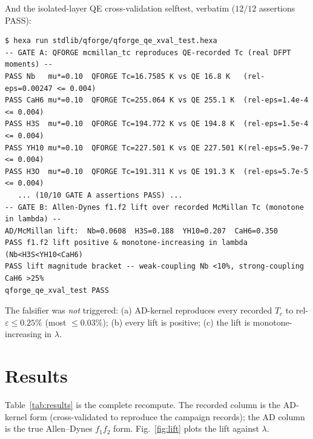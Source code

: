 \documentclass[11pt,a4paper]{article}
\begin{document}
\noindent And the isolated-layer QE cross-validation selftest, verbatim
($12/12$ assertions PASS):

\begin{lstlisting}[basicstyle=\ttfamily\footnotesize,frame=single,xleftmargin=0pt]
$ hexa run stdlib/qforge/qforge_qe_xval_test.hexa
-- GATE A: QFORGE mcmillan_tc reproduces QE-recorded Tc (real DFPT moments) --
PASS Nb   mu*=0.10  QFORGE Tc=16.7585 K vs QE 16.8 K   (rel-eps=0.00247 <= 0.004)
PASS CaH6 mu*=0.10  QFORGE Tc=255.064 K vs QE 255.1 K  (rel-eps=1.4e-4 <= 0.004)
PASS H3S  mu*=0.10  QFORGE Tc=194.772 K vs QE 194.8 K  (rel-eps=1.5e-4 <= 0.004)
PASS YH10 mu*=0.10  QFORGE Tc=227.501 K vs QE 227.501 K(rel-eps=5.9e-7 <= 0.004)
PASS H3O  mu*=0.10  QFORGE Tc=191.311 K vs QE 191.3 K  (rel-eps=5.7e-5 <= 0.004)
   ... (10/10 GATE A assertions PASS) ...
-- GATE B: Allen-Dynes f1.f2 lift over recorded McMillan Tc (monotone in lambda) --
AD/McMillan lift:  Nb=0.0608  H3S=0.188  YH10=0.207  CaH6=0.350
PASS f1.f2 lift positive & monotone-increasing in lambda (Nb<H3S<YH10<CaH6)
PASS lift magnitude bracket -- weak-coupling Nb <10%, strong-coupling CaH6 >25%
qforge_qe_xval_test PASS
\end{lstlisting}

The falsifier was \emph{not} triggered: (a) AD-kernel reproduces every recorded
$T_c$ to rel-$\varepsilon \le 0.25\%$ (most $\le 0.03\%$); (b) every lift is
positive; (c) the lift is monotone-increasing in $\lambda$.

\section{Results}
\label{sec:results}

Table~\ref{tab:results} is the complete recompute. The recorded column is the
AD-kernel form (cross-validated to reproduce the campaign records); the AD
column is the true Allen--Dynes $f_1 f_2$ form. Fig.~\ref{fig:lift} plots the
lift against $\lambda$.
\end{document}
